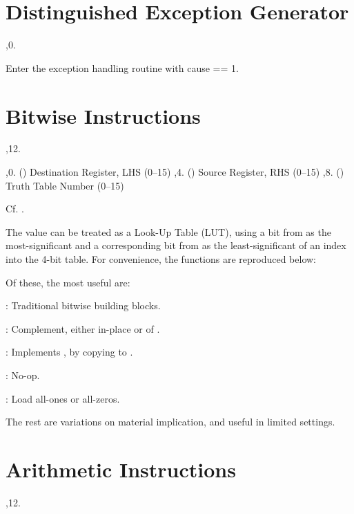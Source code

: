 \section{Distinguished Exception Generator}

\noindent\ins{},0. 

Enter the exception handling routine with cause == 1.

\section{Bitwise Instructions}

\noindent\ins{},12. 

\li \ins{},0. () Destination Register, LHS (0--15)
\li \ins{},4. () Source Register, RHS (0--15)
\li \ins{},8. () Truth Table Number (0--15)

Cf.  .

The value  can be treated as a Look-Up Table (LUT), using a bit from
 as the most-significant and a corresponding bit from  as the
least-significant of an index into the 4-bit table. For convenience, the
functions are reproduced below:

\bigskip
{
	\tabskip=3pt
}
\bigskip

Of these, the most useful are:

: Traditional bitwise building blocks.

: Complement, either in-place or of .

: Implements , by copying  to .

: No-op.

: Load all-ones or all-zeros.

The rest are variations on material implication, and useful in limited
settings.

\section{Arithmetic Instructions}

\noindent\ins{},12. 


